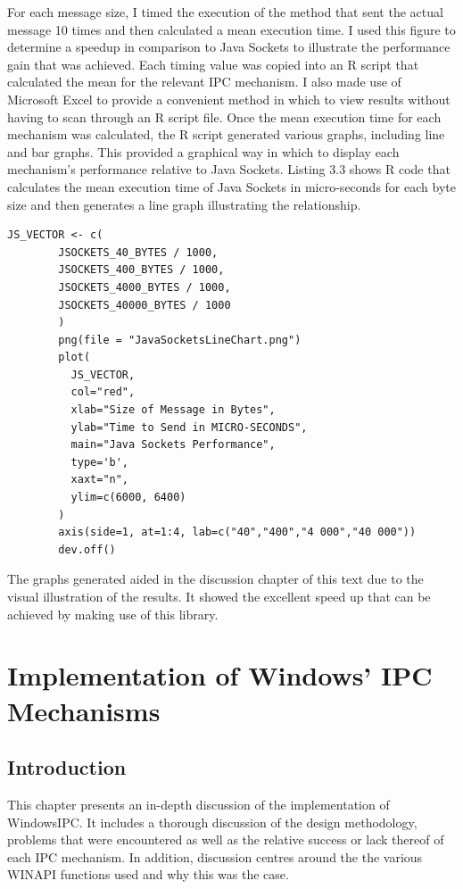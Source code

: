 \documentclass[12pt] {newrucsthesis}    %
\begin{document}
      For each message size, I timed the execution of the method that sent the actual message 10 times and then calculated a mean execution time. I
      used this figure to determine a speedup in comparison to Java Sockets to illustrate the performance gain
      that was achieved. Each timing value was copied into an R script that calculated the mean for the relevant IPC mechanism.
      I also made use of Microsoft Excel to provide a convenient method in which to view results without having to scan through an
      R script file. Once the mean execution time for each mechanism was calculated, the R script generated various graphs, including line and
      bar graphs. This provided a graphical way in which to display each mechanism's performance relative to Java Sockets. Listing 3.3 shows R
      code that calculates the mean execution time of Java Sockets in micro-seconds for each byte size and then generates a line graph
      illustrating the relationship.

      \begin {lstlisting}[caption=Snippet of R Script that Generates Stats and Graphs]
        JS_VECTOR <- c(
        JSOCKETS_40_BYTES / 1000,
        JSOCKETS_400_BYTES / 1000,
        JSOCKETS_4000_BYTES / 1000,
        JSOCKETS_40000_BYTES / 1000
        )
        png(file = "JavaSocketsLineChart.png")
        plot(
          JS_VECTOR,
          col="red",
          xlab="Size of Message in Bytes",
          ylab="Time to Send in MICRO-SECONDS",
          main="Java Sockets Performance",
          type='b',
          xaxt="n",
          ylim=c(6000, 6400)
        )
        axis(side=1, at=1:4, lab=c("40","400","4 000","40 000"))
        dev.off()
      \end{lstlisting}

      The graphs generated aided in the discussion chapter of this text due to the visual illustration of the results.
      It showed the excellent speed up that can be achieved by making use of this library.



  \chapter{Implementation of Windows' IPC Mechanisms}
    \section{Introduction}
      This chapter presents an in-depth discussion of the implementation of WindowsIPC. It includes a thorough
      discussion of the design methodology, problems that were encountered as well as the relative success or lack
      thereof of each IPC mechanism. In addition, discussion centres around the the various WINAPI functions used and
      why this was the case.
\end{document}
